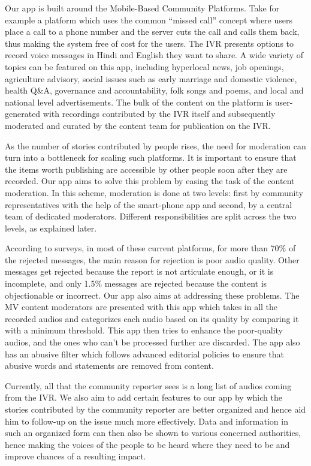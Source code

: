 \documentclass[11pt]{article}
\begin{document}
    
    Our app is built around the Mobile-Based Community Platforms. Take for example a platform which uses the common “missed call” concept where users place a call to a phone number and the server cuts the call and calls them back, thus making the system free of cost for the users. The IVR presents options to record voice messages in Hindi and English they want to share. A wide variety of topics can be featured on this app, including hyperlocal news, job openings, agriculture advisory, social issues such as early marriage and domestic violence, health Q&A, governance and accountability, folk songs and poems, and local and national level advertisements. The bulk of the content on the platform is user-generated with recordings contributed by the IVR itself and subsequently moderated and
    curated by the content team for publication on the IVR.\newline
    
    
    As the number of stories contributed by people rises, the need for moderation can turn
    into a bottleneck for scaling such platforms. It is important to ensure that the items
    worth publishing are accessible by other people soon after they are recorded. Our app
    aims to solve this problem by easing the task of the content moderation. In this scheme, moderation is done at two levels: first by community representatives with the help of the smart-phone app and second, by a central team of dedicated moderators. Different responsibilities are split across the two levels, as explained later.\newline
    
    
    According to surveys, in most of these current platforms, for more than 70\% of the rejected messages, the main reason for rejection is poor audio quality. Other messages get rejected because the report is not articulate enough, or it is incomplete, and only 1.5\% messages are rejected because the content is objectionable or incorrect. Our app also aims at addressing these problems. The MV content moderators are presented with this app which takes in all the recorded audios and categorizes each audio based on its quality by comparing it with a minimum threshold. This app then tries to enhance the poor-quality audios, and the ones who can’t be processed further are discarded. The app also has an abusive filter which follows advanced editorial policies to ensure that abusive words and statements are removed from content.\newline
    
    
    Currently, all that the community reporter sees is a long list of audios coming from the IVR. We also aim to add certain features to our app by which the stories contributed by the community reporter are better organized and hence aid him to follow-up on the issue much more effectively. Data and information in such an organized form can then also be shown to various concerned authorities, hence making the voices of the people to be heard where they need to be and improve chances
    of a resulting impact.\newline
    
\end{document}
